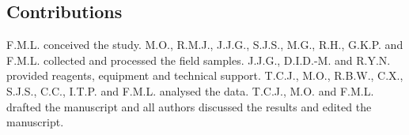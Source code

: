 \begin{refsection}
\section{Contributions}

F.M.L. conceived the study. M.O., R.M.J., J.J.G., S.J.S., M.G., R.H., G.K.P. and F.M.L. collected and processed the field samples. J.J.G., D.I.D.-M. and R.Y.N. provided reagents, equipment and technical support. T.C.J., M.O., R.B.W., C.X., S.J.S., C.C., I.T.P. and F.M.L. analysed the data. T.C.J., M.O. and F.M.L. drafted the manuscript and all authors discussed the results and edited the manuscript.

\printbibliography[heading=subbibliography]

\end{refsection}
